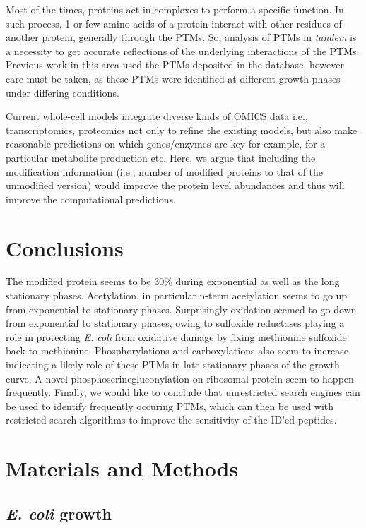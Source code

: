 \documentclass[12pt]{article}
\begin{document}
Most of the times, proteins act in complexes to perform a specific function. In such process, 1 or few amino acids of a protein interact with other residues of another protein, generally through the PTMs. So, analysis of PTMs in \emph{tandem} is a necessity to get accurate reflections of the underlying interactions of the PTMs. Previous work in this area used the PTMs deposited in the database, however care must be taken, as these PTMs were identified at different growth phases under differing conditions.

Current whole-cell models \cite{Covertetal2008} integrate diverse kinds of OMICS data i.e., transcriptomics, proteomics not only to refine the existing models, but also make reasonable predictions on which genes/enzymes are key for example, for a particular metabolite production etc. Here, we argue that including the modification information (i.e., number of modified proteins to that of the unmodified version) would improve the protein level abundances and thus will improve the computational predictions.



\section{Conclusions}

The modified protein seems to be 30\% during exponential as well as the long stationary phases. Acetylation, in particular n-term acetylation seems to go up from exponential to stationary phases. Surprisingly oxidation seemed to go down from exponential to stationary phases, owing to sulfoxide reductases playing a role in protecting \emph{E. coli} from oxidative damage by fixing methionine sulfoxide back to methionine. Phosphorylations and carboxylations also seem to increase indicating a likely role of these PTMs in late-stationary phases of the growth curve. A novel phosphoserinegluconylation on ribosomal protein seem to happen frequently. Finally, we would like to conclude that unrestricted search engines can be used to identify frequently occuring PTMs, which can then be used with restricted search algorithms to improve the sensitivity of the ID'ed peptides.


\section{Materials and Methods}

\subsection{\emph{E. coli} growth} 
\end{document}
